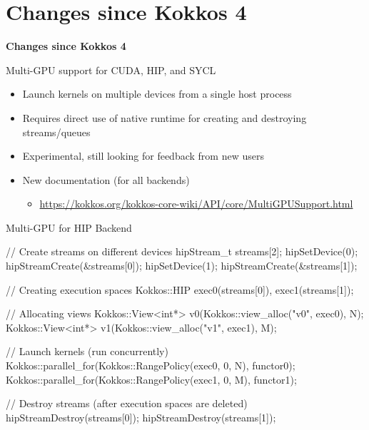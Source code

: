 \section {Changes since Kokkos 4}

\begin{frame}
  \vfill
  \centering
  \textbf{\huge{Changes since Kokkos 4}}
  \vfill
\end{frame}

\begin{frame}[fragile]{Multi-GPU support for CUDA, HIP, and SYCL}
  \begin{itemize}
    \item Launch kernels on multiple devices from a single host process
    \item Requires direct use of native runtime for creating and destroying streams/queues
    \item Experimental, still looking for feedback from new users
    \item New documentation (for all backends)  
      \begin{itemize} 
        \item[] \url{https://kokkos.org/kokkos-core-wiki/API/core/MultiGPUSupport.html}
      \end{itemize}
  \end{itemize}
\end{frame}

\begin{frame}[fragile]{Multi-GPU for HIP Backend}
  \begin{code}[keywords={auto}]
// Create streams on different devices
hipStream_t streams[2];
hipSetDevice(0); hipStreamCreate(&streams[0]);
hipSetDevice(1); hipStreamCreate(&streams[1]);
{
  // Creating execution spaces 
  Kokkos::HIP exec0(streams[0]), exec1(streams[1]);

  // Allocating views
  Kokkos::View<int*> v0(Kokkos::view_alloc("v0", exec0), N);
  Kokkos::View<int*> v1(Kokkos::view_alloc("v1", exec1), M);

  // Launch kernels (run concurrently)
  Kokkos::parallel_for(Kokkos::RangePolicy(exec0, 0, N), functor0);
  Kokkos::parallel_for(Kokkos::RangePolicy(exec1, 0, M), functor1);
}
// Destroy streams (after execution spaces are deleted)
hipStreamDestroy(streams[0]); hipStreamDestroy(streams[1]);
  \end{code}
\end{frame}


